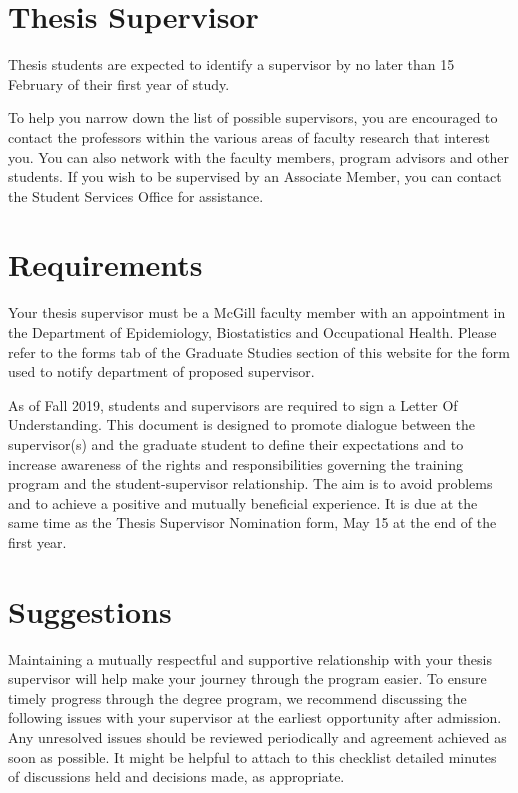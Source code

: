 \documentclass[
  openany]{book}
\begin{document}
\hypertarget{thesis-supervisor}{%
\section{Thesis Supervisor}\label{thesis-supervisor}}

Thesis students are expected to identify a supervisor by no later than 15 February of their first year of study.

To help you narrow down the list of possible supervisors, you are encouraged to contact the professors within the various areas of faculty research that interest you. You can also network with the faculty members, program advisors and other students. If you wish to be supervised by an Associate Member, you can contact the Student Services Office for assistance.

\hypertarget{requirements}{%
\section{Requirements}\label{requirements}}

Your thesis supervisor must be a McGill faculty member with an appointment in the Department of Epidemiology, Biostatistics and Occupational Health. Please refer to the forms tab of the Graduate Studies section of this website for the form used to notify department of proposed supervisor.

As of Fall 2019, students and supervisors are required to sign a Letter Of Understanding. This document is designed to promote dialogue between the supervisor(s) and the graduate student to define their expectations and to increase awareness of the rights and responsibilities governing the training program and the student-supervisor relationship. The aim is to avoid problems and to achieve a positive and mutually beneficial experience. It is due at the same time as the Thesis Supervisor Nomination form, May 15 at the end of the first year.

\hypertarget{suggestions}{%
\section{Suggestions}\label{suggestions}}

Maintaining a mutually respectful and supportive relationship with your thesis supervisor will help make your journey through the program easier. To ensure timely progress through the degree program, we recommend discussing the following issues with your supervisor at the earliest opportunity after admission. Any unresolved issues should be reviewed periodically and agreement achieved as soon as possible. It might be helpful to attach to this checklist detailed minutes of discussions held and decisions made, as appropriate.
\end{document}
